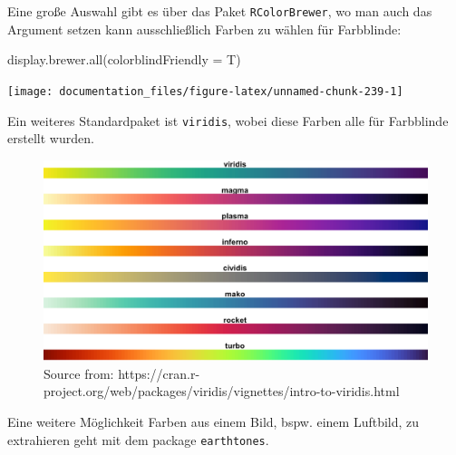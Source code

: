 \documentclass[
]{article}
\newenvironment{Shaded}{\begin{snugshade}}{\end{snugshade}}
\newcommand{\AttributeTok}[1]{\textcolor[rgb]{0.77,0.63,0.00}{#1}}
\newcommand{\FunctionTok}[1]{\textcolor[rgb]{0.00,0.00,0.00}{#1}}
\newcommand{\NormalTok}[1]{#1}
\begin{document}
Eine große Auswahl gibt es über das Paket \texttt{RColorBrewer}, wo man auch das Argument setzen kann ausschließlich Farben zu wählen für Farbblinde:

\begin{Shaded}
\begin{Highlighting}[]
\FunctionTok{display.brewer.all}\NormalTok{(}\AttributeTok{colorblindFriendly =}\NormalTok{ T)}
\end{Highlighting}
\end{Shaded}

\begin{center}\texttt{[image: documentation\_files/figure-latex/unnamed-chunk-239-1]} \end{center}

Ein weiteres Standardpaket ist \texttt{viridis}, wobei diese Farben alle für Farbblinde erstellt wurden.

\begin{figure}

{\centering \includegraphics[width=1\linewidth]{images/061} 

}

\caption{Source from: https://cran.r-project.org/web/packages/viridis/vignettes/intro-to-viridis.html}\label{fig:unnamed-chunk-240}
\end{figure}

Eine weitere Möglichkeit Farben aus einem Bild, bspw. einem Luftbild, zu extrahieren geht mit dem package \texttt{earthtones}.
\end{document}
